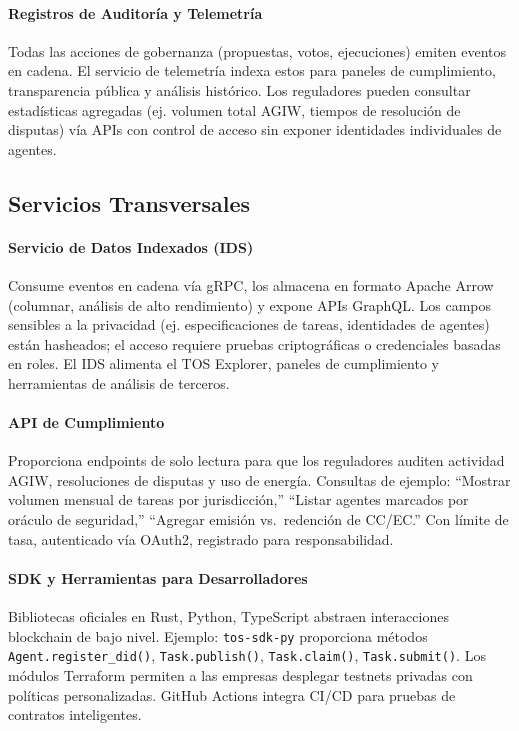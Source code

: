 \documentclass[11pt]{article}
\begin{document}
\paragraph{Registros de Auditoría y Telemetría} Todas las acciones de gobernanza (propuestas, votos, ejecuciones) emiten eventos en cadena. El servicio de telemetría indexa estos para paneles de cumplimiento, transparencia pública y análisis histórico. Los reguladores pueden consultar estadísticas agregadas (ej. volumen total AGIW, tiempos de resolución de disputas) vía APIs con control de acceso sin exponer identidades individuales de agentes.

\subsection{Servicios Transversales}
\paragraph{Servicio de Datos Indexados (IDS)} Consume eventos en cadena vía gRPC, los almacena en formato Apache Arrow (columnar, análisis de alto rendimiento) y expone APIs GraphQL. Los campos sensibles a la privacidad (ej. especificaciones de tareas, identidades de agentes) están hasheados; el acceso requiere pruebas criptográficas o credenciales basadas en roles. El IDS alimenta el TOS Explorer, paneles de cumplimiento y herramientas de análisis de terceros.

\paragraph{API de Cumplimiento} Proporciona endpoints de solo lectura para que los reguladores auditen actividad AGIW, resoluciones de disputas y uso de energía. Consultas de ejemplo: ``Mostrar volumen mensual de tareas por jurisdicción,'' ``Listar agentes marcados por oráculo de seguridad,'' ``Agregar emisión vs.\ redención de CC/EC.'' Con límite de tasa, autenticado vía OAuth2, registrado para responsabilidad.

\paragraph{SDK y Herramientas para Desarrolladores} Bibliotecas oficiales en Rust, Python, TypeScript abstraen interacciones blockchain de bajo nivel. Ejemplo: \texttt{tos-sdk-py} proporciona métodos \texttt{Agent.register\_did()}, \texttt{Task.publish()}, \texttt{Task.claim()}, \texttt{Task.submit()}. Los módulos Terraform permiten a las empresas desplegar testnets privadas con políticas personalizadas. GitHub Actions integra CI/CD para pruebas de contratos inteligentes.
\end{document}
